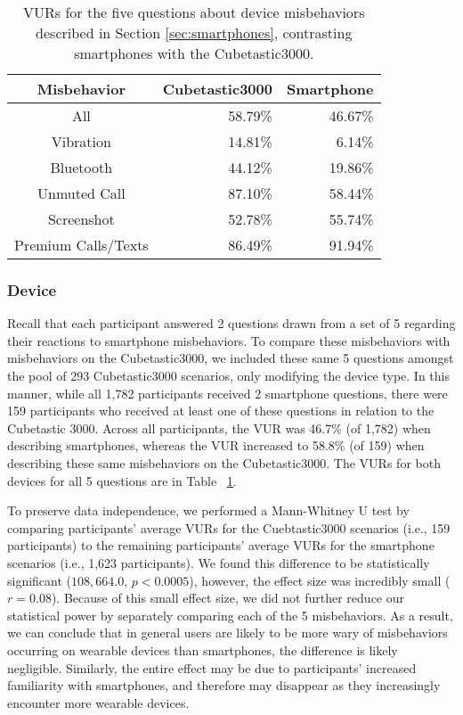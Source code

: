 

\begin{table}[t]
\begin{center}
\begin{tabular}{| c | r | r |}
\hline
 Misbehavior &  Cubetastic3000 & Smartphone \\
 \hline
 \hline
 All & 58.79\% & 46.67\%\\
 \hline
Vibration & 14.81\%  &  6.14\%\\
Bluetooth & 44.12\%  &  19.86\%\\
Unmuted Call & 87.10\%  &  58.44\%\\
Screenshot & 52.78\%  & 55.74\%\\
Premium Calls/Texts & 86.49\%  &  91.94\%\\ 
\hline
\end{tabular}
\caption{VURs for the five questions about device misbehaviors described in Section \ref{sec:smartphones}, contrasting smartphones with the Cubetastic3000.}
\label{deviceVUR}
\end{center}
\end{table}

\subsubsection{Device}
Recall that each participant answered 2 questions drawn from a set of 5 regarding their reactions to smartphone misbehaviors. To compare these misbehaviors with misbehaviors on the Cubetastic3000, we included these same 5 questions amongst the pool of 293 Cubetastic3000 scenarios, only modifying the device type. In this manner, while all 1,782 participants received 2 smartphone questions, there were 159 participants who received at least one of these questions in relation to the Cubetastic 3000. Across all participants, the VUR was 46.7\% (of 1,782) when describing smartphones, whereas the VUR increased to 58.8\% (of 159) when describing these same misbehaviors on the Cubetastic3000. The VURs for both devices for all 5 questions are in Table ~\ref{deviceVUR}.

To preserve data independence, we performed a Mann-Whitney U test by comparing participants' average VURs for the Cuebtastic3000 scenarios (i.e., 159 participants) to the remaining participants' average VURs for the smartphone scenarios (i.e., 1,623 participants). We found this difference to be statistically significant ($108,664.0$, $p<0.0005$), however, the effect size was incredibly small ($r=0.08$). Because of this small effect size, we did not further reduce our statistical power by separately comparing each of the 5 misbehaviors. As a result, we can conclude that in general users are likely to be more wary of misbehaviors occurring on wearable devices than smartphones, the difference is likely negligible. Similarly, the entire effect may be due to participants' increased familiarity with smartphones, and therefore may disappear as they increasingly encounter more wearable devices.


